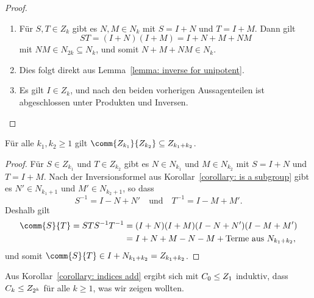 \begin{proof}
  \leavevmode
  \begin{enumerate}
    \item
      Für $S, T \in Z_k$ gibt es $N, M \in N_k$ mit $S = I + N$ und $T = I + M$.
      Dann gilt
      \[
          S T
        = (I + N)(I + M)
        = I + N + M + NM
      \]
      mit $NM \in N_{2k} \subseteq N_k$, und somit $N + M + NM \in N_k$.
    \item
      Dies folgt direkt aus Lemma~\ref{lemma: inverse for unipotent}.
    \item
      Es gilt $I \in Z_k$, und nach den beiden vorherigen Aussagenteilen ist abgeschlossen unter Produkten und Inversen.
    \qedhere
  \end{enumerate}
\end{proof}

\begin{corollary}
  \label{corollary: indices add}
  Für alle $k_1, k_2 \geq 1$ gilt $\comm{Z_{k_1}}{Z_{k_2}} \subseteq Z_{k_1 + k_2}$.
\end{corollary}

\begin{proof}
  Für $S \in Z_{k_1}$ und $T \in Z_{k_2}$ gibt es $N \in N_{k_1}$ und $M \in N_{k_2}$ mit $S = I + N$ und $T = I + M$.
  Nach der Inversionsformel aus Korollar~\ref{corollary: is a subgroup} gibt es $N' \in N_{k_1 + 1}$ und $M' \in N_{k_2 + 1}$, so dass
  \[
      S^{-1}
    = I - N + N'
    \quad\text{und}\quad
      T^{-1}
    = I - M + M'.
  \]
  Deshalb gilt
  \begin{align*}
        \comm{S}{T}
     =  S T S^{-1} T^{-1}
    &=  (I + N)(I + M)(I - N + N')(I - M + M')
    \\
    &=  I + N + M - N - M + \text{Terme aus $N_{k_1 + k_2}$},
  \end{align*}
  und somit $\comm{S}{T} \in I + N_{k_1 + k_2} = Z_{k_1 + k_2}$.
\end{proof}

Aus Korollar~\ref{corollary: indices add} ergibt sich mit $C_0 \leq Z_1$ induktiv, dass $C_k \leq Z_{2^k}$ für alle $k \geq 1$, was wir zeigen wollten.
















